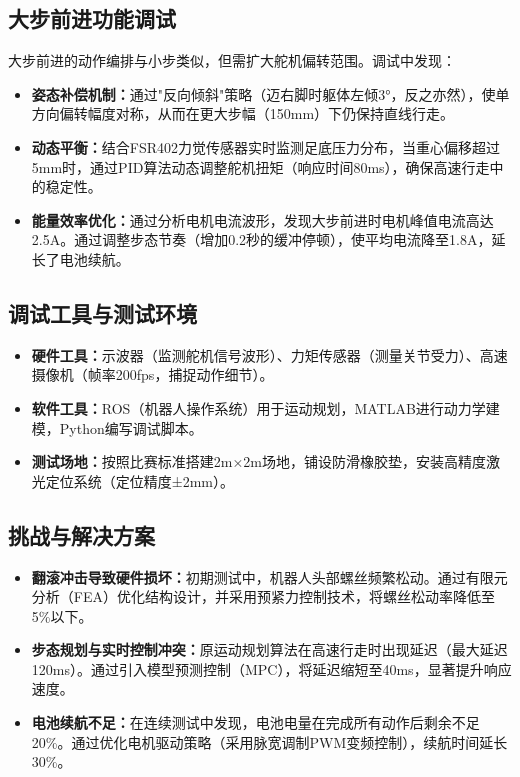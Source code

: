 \documentclass[a4paper,fontset=windows]{ctexart}
\providecommand{\tightlist}{%
  \setlength{\itemsep}{0pt}\setlength{\parskip}{0pt}}
\begin{document}
\subsection{大步前进功能调试}
大步前进的动作编排与小步类似，但需扩大舵机偏转范围。调试中发现：
\begin{itemize}
    \tightlist
    \item \textbf{姿态补偿机制：}通过"反向倾斜"策略（迈右脚时躯体左倾3°，反之亦然），使单方向偏转幅度对称，从而在更大步幅（150mm）下仍保持直线行走。
    \item \textbf{动态平衡：}结合FSR402力觉传感器实时监测足底压力分布，当重心偏移超过5mm时，通过PID算法动态调整舵机扭矩（响应时间80ms），确保高速行走中的稳定性。
    \item \textbf{能量效率优化：}通过分析电机电流波形，发现大步前进时电机峰值电流高达2.5A。通过调整步态节奏（增加0.2秒的缓冲停顿），使平均电流降至1.8A，延长了电池续航。
\end{itemize}
\subsection{调试工具与测试环境}
\begin{itemize}
    \tightlist
    \item \textbf{硬件工具：}示波器（监测舵机信号波形）、力矩传感器（测量关节受力）、高速摄像机（帧率200fps，捕捉动作细节）。
    \item \textbf{软件工具：}ROS（机器人操作系统）用于运动规划，MATLAB进行动力学建模，Python编写调试脚本。
    \item \textbf{测试场地：}按照比赛标准搭建2m×2m场地，铺设防滑橡胶垫，安装高精度激光定位系统（定位精度±2mm）。
\end{itemize}
\subsection{挑战与解决方案}
\begin{itemize}
    \tightlist
    \item \textbf{翻滚冲击导致硬件损坏：}初期测试中，机器人头部螺丝频繁松动。通过有限元分析（FEA）优化结构设计，并采用预紧力控制技术，将螺丝松动率降低至5\%以下。
    \item \textbf{步态规划与实时控制冲突：}原运动规划算法在高速行走时出现延迟（最大延迟120ms）。通过引入模型预测控制（MPC），将延迟缩短至40ms，显著提升响应速度。
    \item \textbf{电池续航不足：}在连续测试中发现，电池电量在完成所有动作后剩余不足20\%。通过优化电机驱动策略（采用脉宽调制PWM变频控制），续航时间延长30\%。
\end{itemize}
\end{document}
